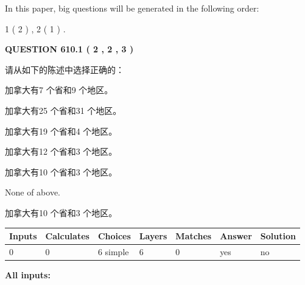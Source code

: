 \documentclass{ctexart}
\begin{document}
In this paper, big questions will be generated in the following order: 
   
   
   1 ( 2 )
 ,
   2 ( 1 )
 .
  
\vspace{0.2in}
  
{\textbf{\Large{QUESTION
610.1 
 ( 2 , 2 , 3 )
}}}
  
  
请从如下的陈述中选择正确的：
 
 
加拿大有7 个省和9 个地区。
 
 
加拿大有25 个省和31 个地区。
 
 
加拿大有19 个省和4 个地区。
 
 
加拿大有12 个省和3 个地区。
 
 
加拿大有10 个省和3 个地区。
 
 
 None of above.
 
 
\noindent{}
 
 
加拿大有10 个省和3 个地区。
 
 
\noindent{}
 
 
   
   
   
   
\noindent\begin{tabular}{|l|l|l|l|l|l|l|}
 \hline
Inputs & Calculates & Choices & Layers & Matches & Answer & Solution \\ \hline
 0  & 
 0  & 
 6
  simple  
  & 
 6  & 
 0  & 
  yes & 
  no 
  \\ \hline
 \end{tabular}
   
   
   
   
\noindent{}
   
   
   
   
\noindent\vspace{0.1in}\hspace{-0.08in} {\textbf{\Large{All inputs: }}}
   
   
  
\vspace{0.2in}
  
\end{document}
